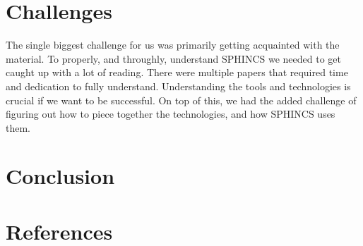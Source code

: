 \documentclass[]{scrartcl}
\begin{document}
\section*{Challenges}
The single biggest challenge for us was primarily getting acquainted with the material. To properly, and throughly, understand SPHINCS we needed to get caught up with a lot of reading. There were multiple papers that required time and dedication to fully understand. Understanding the tools and technologies is crucial if we want to be successful. On top of this, we had the added challenge of figuring out how to piece together the technologies, and how SPHINCS uses them.

\section*{Conclusion}

\section*{References}
\end{document}
